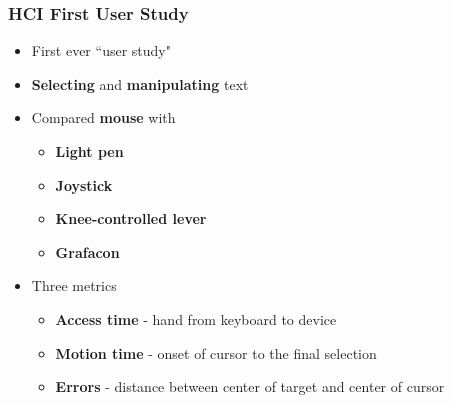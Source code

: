 \documentclass{beamer}
\begin{document}
\begin{frame}
\frametitle{HCI First User Study}
\begin{itemize}
	\item First ever ``user study" %
	\item \textbf{Selecting} and \textbf{manipulating} text
	\item Compared \textbf{mouse} with %
	\begin{itemize}
		\item \textbf{Light pen} %
		\item  \textbf{Joystick}%
		\item \textbf{Knee-controlled lever}%
		\item \textbf{Grafacon}%
	\end{itemize}
	\item Three metrics %
	\begin{itemize}
		\item \textbf{Access time} - hand from keyboard to device %
		\item \textbf{Motion time} - onset of cursor to the final selection %
		\item \textbf{Errors} - distance between center of target and center of cursor
	\end{itemize}
\end{itemize}
\end{frame}
\end{document}
